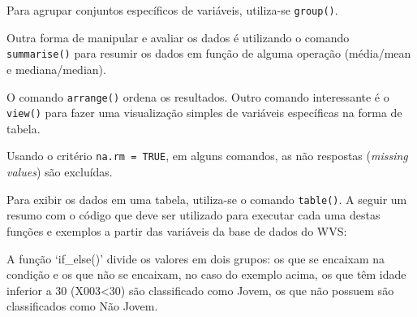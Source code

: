\documentclass[
  10pt,
  brazil,
  a4paper,
  twoside, notitlepage, openright]{book}
\newenvironment{Shaded}{\begin{snugshade}}{\end{snugshade}}
\newcommand{\CommentTok}[1]{\textcolor[rgb]{0.56,0.35,0.01}{\textit{#1}}}
\newcommand{\DataTypeTok}[1]{\textcolor[rgb]{0.13,0.29,0.53}{#1}}
\newcommand{\DecValTok}[1]{\textcolor[rgb]{0.00,0.00,0.81}{#1}}
\newcommand{\KeywordTok}[1]{\textcolor[rgb]{0.13,0.29,0.53}{\textbf{#1}}}
\newcommand{\NormalTok}[1]{#1}
\newcommand{\OperatorTok}[1]{\textcolor[rgb]{0.81,0.36,0.00}{\textbf{#1}}}
\newcommand{\StringTok}[1]{\textcolor[rgb]{0.31,0.60,0.02}{#1}}
\begin{document}
Para agrupar conjuntos específicos de variáveis, utiliza-se \texttt{group()}.

Outra forma de manipular e avaliar os dados é utilizando o comando \texttt{summarise()} para resumir os dados em função de alguma operação (média/mean e mediana/median).

O comando \texttt{arrange()} ordena os resultados. Outro comando interessante é o \texttt{view()} para fazer uma visualização simples de variáveis específicas na forma de tabela.

Usando o critério \texttt{na.rm\ =\ TRUE}, em alguns comandos, as não respostas (\emph{missing values}) são excluídas.

Para exibir os dados em uma tabela, utiliza-se o comando \texttt{table()}. A seguir um resumo com o código que deve ser utilizado para executar cada uma destas funções e exemplos a partir das variáveis da base de dados do WVS:

\begin{Shaded}
\end{Shaded}

A função `if\_else()' divide os valores em dois grupos: os que se encaixam na condição e os que não se encaixam, no caso do exemplo acima, os que têm idade inferior a 30 (X003\textless30) são classificado como Jovem, os que não possuem são classificados como Não Jovem.
\end{document}
